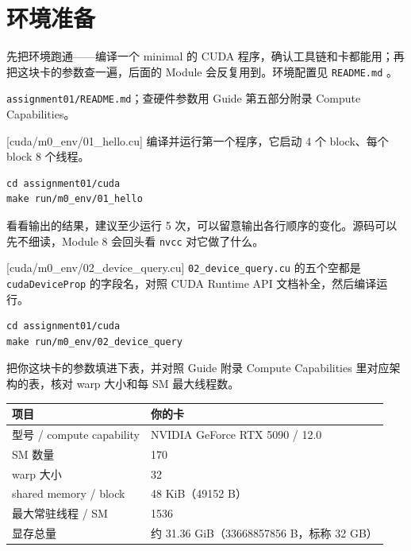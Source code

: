 \documentclass[11pt,a4paper,fontset=windows]{ctexart}
\begin{document}
\setcounter{section}{-1}

\section{环境准备}

先把环境跑通——编译一个 minimal 的 CUDA 程序，确认工具链和卡都能用；再把这块卡的参数查一遍，后面的 Module 会反复用到。环境配置见 \texttt{README.md} 。

\begin{reading}
\texttt{assignment01/README.md}；查硬件参数用 Guide 第五部分附录 Compute Capabilities。
\end{reading}

[cuda/m0\_env/01\_hello.cu]
编译并运行第一个程序，它启动 4 个 block、每个 block 8 个线程。

\begin{lstlisting}
cd assignment01/cuda
make run/m0_env/01_hello
\end{lstlisting}

看看输出的结果，建议至少运行 5 次，可以留意输出各行顺序的变化。源码可以先不细读，Module 8 会回头看 \texttt{nvcc} 对它做了什么。

[cuda/m0\_env/02\_device\_query.cu]
\texttt{02\_device\_query.cu} 的五个空都是 \texttt{cudaDeviceProp} 的字段名，对照 CUDA Runtime API 文档补全，然后编译运行。

\begin{lstlisting}
cd assignment01/cuda
make run/m0_env/02_device_query
\end{lstlisting}

把你这块卡的参数填进下表，并对照 Guide 附录 Compute Capabilities 里对应架构的表，核对 warp 大小和每 SM 最大线程数。

\begin{center}\small
\begin{tabular}{@{}ll@{}}
\toprule
项目 & 你的卡 \\
\midrule
型号 / compute capability & NVIDIA GeForce RTX 5090 / 12.0 \\
SM 数量 & 170 \\
warp 大小 & 32 \\
shared memory / block & 48 KiB（49152 B） \\
最大常驻线程 / SM & 1536 \\
显存总量 & 约 31.36 GiB（33668857856 B，标称 32 GB） \\
\bottomrule
\end{tabular}
\end{center}
\end{document}
